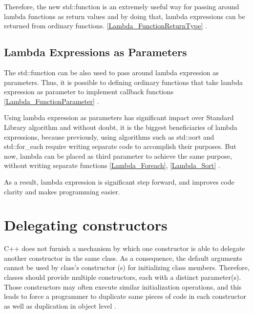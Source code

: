 \documentclass[11pt]{report}
\begin{document}
Therefore, the new std::function is an extremely useful way for passing around lambda functions as return values and by doing that, lambda expressions can be returned from ordinary functions. \ref{Lambda_FunctionReturnType} \cite {Josuttis:2012:CppStandard Library}.
\newline

\subsection{Lambda Expressions as Parameters}
\label{subsection: Lambda Expressions as Parameters}
The std::function can be also used to pass around lambda expression as parameters. Thus, it is possible to defining ordinary functions that take lambda expression as parameter to implement callback functions \ref{Lambda_FunctionParameter} \cite{Allain:2011:FutureCpp}.
\newline

Using lambda expression as parameters has significant impact over Standard Library algorithm and without doubt, it is the biggest beneficiaries of lambda expressions, because previously, using algorithms such as std::sort and std::for\_each require writing separate code to accomplish their purposes. But now, lambda can be placed as third parameter to achieve the same purpose, without writing separate functions \ref{Lambda_Foreach}, \ref{Lambda_Sort} \cite {Gregorie:professionalcpp}.
\newline

As a result, lambda expression is significant step forward, and improves code clarity and makes programming easier.

\section{Delegating constructors}
\label{section: Delegating constructors}
C++ does not furnish a mechanism by which one constructor is able to delegate another constructor in the same class.  As a consequence, the default arguments cannot be used by class's constructor (s) for initializing class members. Therefore, classes should provide multiple constructors, each with a distinct parameter(s). Those constructors may often execute similar initialization operations, and this leads to force a programmer to duplicate same pieces of code in each constructor as well as duplication in object level \cite{Overland:2011:CWF}.
\newline
\end{document}
